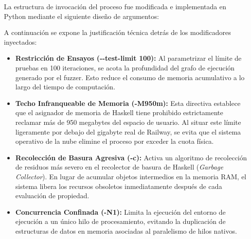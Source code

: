 La estructura de invocación del proceso fue modificada e implementada en
Python mediante el siguiente diseño de argumentos:

\begin{Shaded}
\begin{Highlighting}[]
\OperatorTok{=}\NormalTok{ [}
    \NormalTok{,}
    \NormalTok{, }\NormalTok{,}
    
    \NormalTok{, }\NormalTok{,  }
    
    \NormalTok{, }\NormalTok{, }
    
    \NormalTok{,      }
    
    \NormalTok{,    }
    \NormalTok{,        }
    \NormalTok{,       }
    
\NormalTok{]}
\end{Highlighting}
\end{Shaded}

A continuación se expone la justificación técnica detrás de los
modificadores inyectados:

\begin{itemize}
\tightlist
\item
  \textbf{Restricción de Ensayos (-\/-test-limit 100):} Al parametrizar
  el límite de pruebas en 100 iteraciones, se acota la profundidad del
  grafo de ejecución generado por el fuzzer. Esto reduce el consumo de
  memoria acumulativo a lo largo del tiempo de computación.
\item
  \textbf{Techo Infranqueable de Memoria (-M950m):} Esta directiva
  establece que el asignador de memoria de Haskell tiene prohibido
  estrictamente reclamar más de 950 megabytes del espacio de usuario. Al
  situar este límite ligeramente por debajo del gigabyte real de
  Railway, se evita que el sistema operativo de la nube elimine el
  proceso por exceder la cuota física.
\item
  \textbf{Recolección de Basura Agresiva (-c):} Activa un algoritmo de
  recolección de residuos más severo en el recolector de basura de
  Haskell (\emph{Garbage Collector}). En lugar de acumular objetos
  intermedios en la memoria RAM, el sistema libera los recursos
  obsoletos inmediatamente después de cada evaluación de propiedad.
\item
  \textbf{Concurrencia Confinada (-N1):} Limita la ejecución del entorno
  de ejecución a un único hilo de procesamiento, evitando la duplicación
  de estructuras de datos en memoria asociadas al paralelismo de hilos
  nativos.
\end{itemize}

